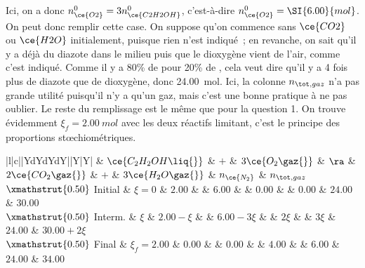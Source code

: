 \documentclass[../../main/main.tex]{subfiles}
\begin{document}
{\[  \]
  Ici, on a donc $n_{\ce{O2}}^0 = 3n_{\ce{C2H2OH}}^0$, c'est-à-dire
  $n_{\ce{O2}}^0 = \SI{6.00}{mol}$. On peut donc remplir cette
  case.
  \bigbreak
  On suppose qu'on commence sans $\ce{CO2}$ ou $\ce{H2O}$ initialement,
  puisque rien n'est indiqué~; en revanche, on sait qu'il y a déjà du
  diazote dans le milieu puis que le dioxygène vient de l'air, comme c'est
  indiqué. Comme il y a 80\% de  pour 20\% de , cela veut
  dire qu'il y a 4 fois plus de diazote que de dioxygène, donc
  \SI{24.00}{mol}. Ici, la colonne $n_{\tot, gaz}$ n'a pas grande
  utilité puisqu'il n'y a qu'un gaz, mais c'est une bonne pratique à ne
  pas oublier.
  \bigbreak
  Le reste du remplissage est le même que pour la question 1. On trouve
  évidemment $\xi_f = \SI{2.00}{mol}$ avec les deux réactifs limitant,
  c'est le principe des proportions stœchiométriques.
  \begin{center}
    \def\rhgt{0.50}
    \centering
    \begin{tabularx}{\linewidth}{|l|c||YdYdYdY||Y|Y|}
      \hline
      \multicolumn{2}{|c||}{
        $\xmathstrut{\rhgt}$
      \textbf{Équation} (\si{mol})} &
      $\ce{C_2H_2OH\liq{}}$         & $+$                  &
      $3\ce{O_2\gaz{}}$             & $\ra$                &
      $2\ce{CO_2\gaz{}}$            & $+$                  &
      $3\ce{H_2O\gaz{}}$            &
      $n_{\ce{N_2}}$                &
      $n_{\tot, gaz}$                                        \\
      \hline
      $\xmathstrut{\rhgt}$
      Initial                       & $\xi = 0$            &
      $\num{2.00}$                  & \vline               &
      $\num{6.00}$                  & \vline               &
      $\num{0.00}$                  & \vline               &
      $\num{0.00}$                  &
      $\num{24.00}$                 &
      $\num{30.00}$                                          \\
      \hline
      $\xmathstrut{\rhgt}$
      Interm.                       & $\xi$                &
      $\num{2.00} - \xi$            & \vline               &
      $\num{6.00} - 3\xi$           & \vline               &
      $2\xi$                        & \vline               &
      $3\xi$                        &
      $\num{24.00}$                 &
      $\num{30.00} + 2\xi$                                   \\
      \hline
      $\xmathstrut{\rhgt}$
      Final                         & $\xi_f = \num{2.00}$ &
      $\num{0.00}$                  & \vline               &
      $\num{0.00}$                  & \vline               &
      $\num{4.00}$                  & \vline               &
      $\num{6.00}$                  &
      $\num{24.00}$                 &
      $\num{34.00}$                                          \\
      \hline
    \end{tabularx}
  \end{center}
}
\end{document}
